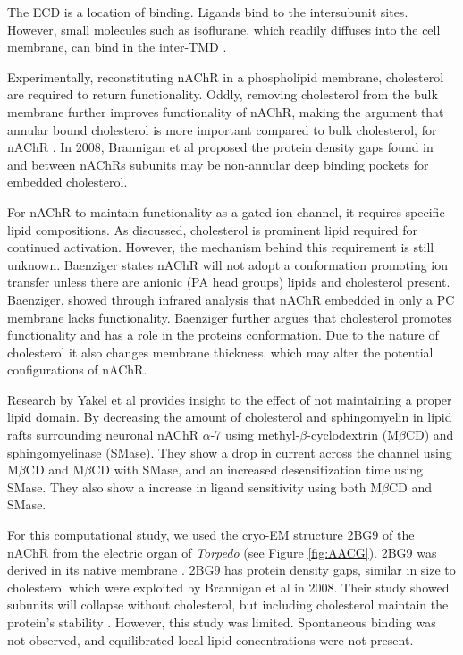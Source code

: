 \documentclass[10pt, letterpaper]{article}
\begin{document}
The ECD is a location of binding. Ligands bind to the intersubunit sites. However, small molecules such as isoflurane, which readily diffuses into the cell membrane, can bind in the inter-TMD \cites{liumechanics2008}{branniganmultiple2010}{corringernicotinic2000}.


Experimentally, reconstituting nAChR in a phospholipid membrane, cholesterol are required to return functionality. Oddly, removing cholesterol from the bulk membrane further improves functionality of nAChR, making the argument that annular bound cholesterol is more important compared to bulk cholesterol, for nAChR \cites{branniganembedded2008}{chenganionic2009}{barrantesthe1989}. In 2008, Brannigan et al \cite{branniganembedded2008} proposed the protein density gaps found in and between nAChRs subunits may be non-annular deep binding pockets for embedded cholesterol. 

For nAChR to maintain functionality as a gated ion channel, it requires specific lipid compositions. As discussed, cholesterol is prominent lipid required for continued activation. However, the mechanism behind this requirement is still unknown. Baenziger \cite{corriea2009} states nAChR will not adopt a conformation promoting ion transfer unless there are anionic (PA head groups) lipids and cholesterol present. Baenziger, showed through infrared analysis that nAChR embedded in only a PC membrane lacks functionality. Baenziger \cite{corriegating2013} further argues that cholesterol promotes functionality and has a role in the proteins conformation. Due to the nature of cholesterol it also changes membrane thickness, which may alter the potential configurations of nAChR. 

Research by Yakel et al \cite{colezthe2011} provides insight to the effect of not maintaining a proper lipid domain. By decreasing the amount of cholesterol and sphingomyelin in lipid rafts surrounding neuronal nAChR $\alpha$-7 using methyl-$\beta$-cyclodextrin (M$\beta$CD) and sphingomyelinase (SMase). They show a drop in current across the channel using M$\beta$CD and M$\beta$CD with SMase, and an increased desensitization time using SMase. They also show a increase in ligand sensitivity using both M$\beta$CD and SMase. 

For this computational study, we used the cryo-EM structure 2BG9 of the nAChR from the electric organ of \textit{Torpedo} (see Figure \ref{fig:AACG}). 2BG9 was derived in its native membrane \cite{miyazawastructure2003}. 2BG9 has protein density gaps, similar in size to cholesterol which were exploited by Brannigan et al in 2008. Their study showed subunits will collapse without cholesterol, but including cholesterol maintain the protein's stability \cite{branniganembedded2008}. However, this study was limited. Spontaneous binding was not observed, and equilibrated local lipid concentrations were not present.
\end{document}
